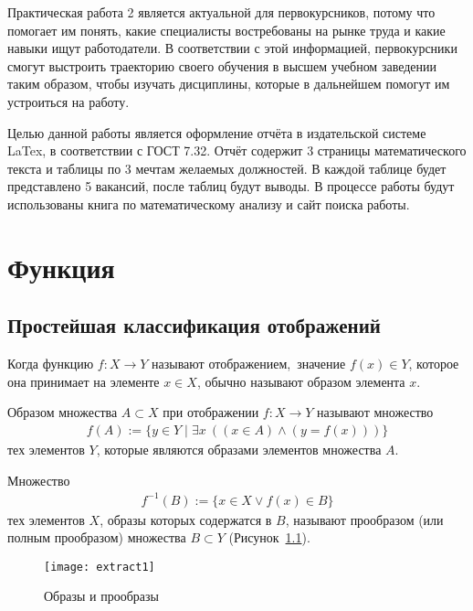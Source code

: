 \documentclass[14pt]{extreport}
\begin{document}
\pagestyle{empty}

\pagestyle{plain}

\tableofcontents

\intro

Практическая работа 2 является актуальной для первокурсников, потому что помогает им понять, какие специалисты востребованы на рынке труда и какие навыки ищут работодатели. В соответствии с этой информацией, первокурсники смогут выстроить траекторию своего обучения в высшем учебном заведении таким образом, чтобы изучать дисциплины, которые в дальнейшем помогут им устроиться на работу.

Целью данной работы является оформление отчёта в издательской системе LaTex, в соответствии с ГОСТ 7.32. Отчёт содержит 3 страницы математического текста и таблицы по 3 мечтам желаемых должностей. В каждой таблице будет представлено 5 вакансий, после таблиц будут выводы. В процессе работы будут использованы книга по математическому анализу и сайт поиска работы.

\chapter{Функция}

\section{Простейшая классификация отображений}

Когда функцию $f\colon X \to Y$ называют отображением, значение $f(x) \in Y$, которое она принимает на элементе $x \in X$, обычно называют образом элемента $x$.

Образом множества $A \subset X$ при отображении $f\colon X \to Y$ называют множество
\begin{eqnarray}
f(A) := \{y \in Y \mid \exists x \ ((x \in A)\land(y=f(x)))\}
\end{eqnarray}
тех элементов $Y$, которые являются образами элементов множества $A$.

Множество
\begin{eqnarray}
f^{-1}(B) := \{ x \in X \lor f(x) \in B\}
\end{eqnarray}
тех элементов $X$, образы которых содержатся в $B$, называют прообразом (или
полным прообразом) множества $B \subset Y$ (Рисунок~\ref{fig11}).

\begin{figure}[H]
\centerline{\texttt{[image: extract1]}}
\caption{Образы и прообразы}
\label{fig11}
\end{figure}
\end{document}
